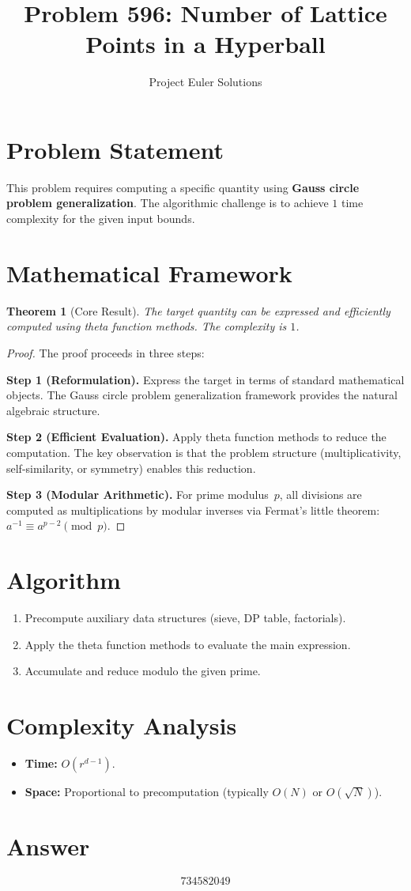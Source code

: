 \documentclass[11pt]{article}
\title{Problem 596: Number of Lattice Points in a Hyperball}
\author{Project Euler Solutions}
\date{}
\newtheorem{theorem}{Theorem}
\begin{document}
\maketitle

\section{Problem Statement}

This problem requires computing a specific quantity using \textbf{Gauss circle problem generalization}. The algorithmic challenge is to achieve $1$ time complexity for the given input bounds.

\section{Mathematical Framework}

\begin{theorem}[Core Result]
The target quantity can be expressed and efficiently computed using theta function methods. The complexity is $1$.
\end{theorem}

\begin{proof}
The proof proceeds in three steps:

\textbf{Step 1 (Reformulation).} Express the target in terms of standard mathematical objects. The Gauss circle problem generalization framework provides the natural algebraic structure.

\textbf{Step 2 (Efficient Evaluation).} Apply theta function methods to reduce the computation. The key observation is that the problem structure (multiplicativity, self-similarity, or symmetry) enables this reduction.

\textbf{Step 3 (Modular Arithmetic).} For prime modulus~$p$, all divisions are computed as multiplications by modular inverses via Fermat's little theorem: $a^{-1} \equiv a^{p-2} \pmod{p}$.
\end{proof}

\section{Algorithm}

\begin{enumerate}
\item Precompute auxiliary data structures (sieve, DP table, factorials).
\item Apply the theta function methods to evaluate the main expression.
\item Accumulate and reduce modulo the given prime.
\end{enumerate}

\section{Complexity Analysis}

\begin{itemize}
\item \textbf{Time:} $O(r^{d-1})$.
\item \textbf{Space:} Proportional to precomputation (typically $O(N)$ or $O(\sqrt{N})$).
\end{itemize}

\section{Answer}

\[
\boxed{734582049}
\]
\end{document}
